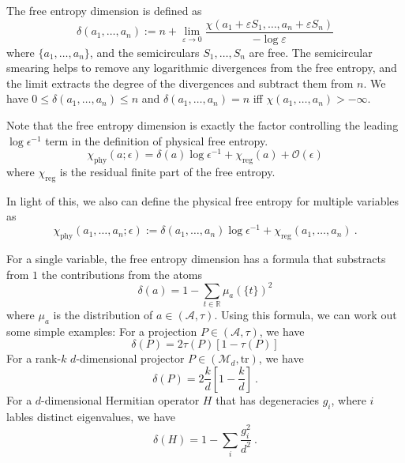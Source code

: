 \documentclass[11pt,letterpaper]{article}
\def\eps{\varepsilon}
\def\tr{\mathrm{tr}}
\begin{document}
The free entropy dimension is defined as 
\begin{equation}\label{eq:fed}
    \delta(a_1,\ldots,a_n):=n+\lim_{\eps\to 0}\frac{\chi(a_1+\eps S_1,\ldots,a_n+\eps S_n)}{-\log\eps}
\end{equation}
where $\{a_1,\ldots,a_n\}$, and the semicirculars $ S_1,\ldots, S_n$ are free. The semicircular smearing helps to remove any logarithmic divergences from the free entropy, and the limit extracts the degree of the divergences and subtract them from $n$.
We have $0\leq\delta(a_1,\dots,a_n)\leq n$ and $\delta(a_1,\ldots,a_n)=n$ iff $\chi(a_1,\ldots,a_n)>-\infty$. 

Note that the free entropy dimension is exactly the factor controlling the leading $\log\epsilon^{-1}$ term in the definition of physical free entropy.
\begin{equation}
    \chi_\mathrm{phy}(a;\epsilon)=\delta(a)\log\epsilon^{-1} + \chi_\mathrm{reg}(a) + \mathcal{O}(\epsilon)
\end{equation}
where $\chi_\mathrm{reg}$ is the residual finite part of the free entropy. 

In light of this, we also can define the physical free entropy for multiple variables as
\begin{equation}
    \chi_\mathrm{phy}(a_1,\ldots,a_n;\epsilon):=\delta(a_1,\ldots,a_n)\log\epsilon^{-1} + \chi_\mathrm{reg}(a_1,\ldots,a_n)\ .
\end{equation}


For a single variable, the free entropy dimension has a formula that substracts from $1$ the contributions from the atoms
\begin{equation}
    \delta(a)=1-\sum_{t\in\mathbb{R}} \mu_a(\{t\})^2
\end{equation}
where $\mu_a$ is the distribution of $a\in (\mathcal{A},\tau)$. Using this formula, we can work out some simple examples: For a projection $P\in (\mathcal{A},\tau)$, we have
\begin{equation}
    \delta(P)=2\tau(P)[1-\tau(P)]
\end{equation}
For a rank-$k$ $d$-dimensional projector $P\in (\mathcal{M}_d,\tr)$, we have
\begin{equation}
    \delta(P)=2\frac{k}d\left[1-\frac{k}d\right]\ .
\end{equation}
For a $d$-dimensional Hermitian operator $H$ that has degeneracies $g_i$, where $i$ lables distinct eigenvalues, we have
\begin{equation}
    \delta(H)=1 - \sum_i\frac{g_i^2}{d^2}\ .
\end{equation}
\end{document}

